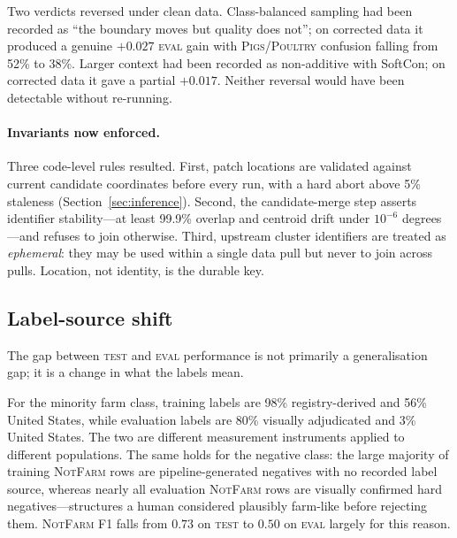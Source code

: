 \documentclass[11pt,a4paper]{article}
\begin{document}
Two verdicts reversed under clean data. Class-balanced sampling had been recorded
as ``the boundary moves but quality does not''; on corrected data it produced a
genuine $+0.027$ \textsc{eval} gain with \textsc{Pigs}/\textsc{Poultry} confusion
falling from 52\% to 38\%. Larger context had been recorded as non-additive with
SoftCon; on corrected data it gave a partial $+0.017$. Neither reversal would
have been detectable without re-running.

\paragraph{Invariants now enforced.} Three code-level rules resulted. First,
patch locations are validated against current candidate coordinates before every
run, with a hard abort above 5\% staleness (Section~\ref{sec:inference}).
Second, the candidate-merge step asserts identifier stability---at least 99.9\%
overlap and centroid drift under $10^{-6}$ degrees---and refuses to join
otherwise. Third, upstream cluster identifiers are treated as \emph{ephemeral}:
they may be used within a single data pull but never to join across pulls.
Location, not identity, is the durable key.

\subsection{Label-source shift}
\label{sec:labelshift}

The gap between \textsc{test} and \textsc{eval} performance is not primarily a
generalisation gap; it is a change in what the labels mean.

For the minority farm class, training labels are 98\% registry-derived and 56\%
United States, while evaluation labels are 80\% visually adjudicated and 3\%
United States. The two are different measurement instruments applied to
different populations. The same holds for the negative class: the large majority
of training \textsc{NotFarm} rows are pipeline-generated negatives with no
recorded label source, whereas nearly all evaluation \textsc{NotFarm} rows are
visually confirmed hard negatives---structures a human considered plausibly
farm-like before rejecting them. \textsc{NotFarm} F1 falls from $0.73$ on
\textsc{test} to $0.50$ on \textsc{eval} largely for this reason.
\end{document}
